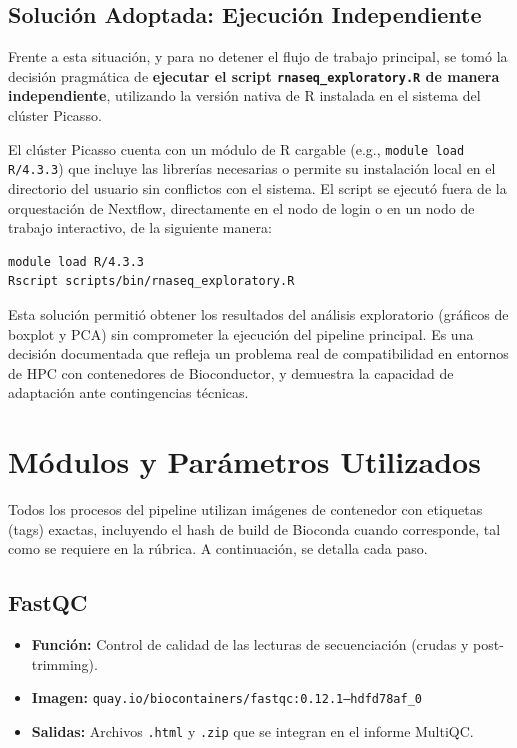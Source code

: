 \documentclass[11pt,a4paper]{article}
\begin{document}
\subsection{Solución Adoptada: Ejecución Independiente}

Frente a esta situación, y para no detener el flujo de trabajo principal, se tomó la decisión pragmática de \textbf{ejecutar el script \texttt{rnaseq\_exploratory.R} de manera independiente}, utilizando la versión nativa de R instalada en el sistema del clúster Picasso.

El clúster Picasso cuenta con un módulo de R cargable (e.g., \texttt{module load R/4.3.3}) que incluye las librerías necesarias o permite su instalación local en el directorio del usuario sin conflictos con el sistema. El script se ejecutó fuera de la orquestación de Nextflow, directamente en el nodo de login o en un nodo de trabajo interactivo, de la siguiente manera:

\begin{verbatim}
module load R/4.3.3
Rscript scripts/bin/rnaseq_exploratory.R
\end{verbatim}

Esta solución permitió obtener los resultados del análisis exploratorio (gráficos de boxplot y PCA) sin comprometer la ejecución del pipeline principal. Es una decisión documentada que refleja un problema real de compatibilidad en entornos de HPC con contenedores de Bioconductor, y demuestra la capacidad de adaptación ante contingencias técnicas.

\section{Módulos y Parámetros Utilizados}
\label{sec:modulos}

Todos los procesos del pipeline utilizan imágenes de contenedor con etiquetas (tags) exactas, incluyendo el hash de build de Bioconda cuando corresponde, tal como se requiere en la rúbrica. A continuación, se detalla cada paso.

\subsection{FastQC}
\begin{itemize}
    \item \textbf{Función:} Control de calidad de las lecturas de secuenciación (crudas y post-trimming).
    \item \textbf{Imagen:} \texttt{quay.io/biocontainers/fastqc:0.12.1--hdfd78af\_0}
    \item \textbf{Salidas:} Archivos \texttt{.html} y \texttt{.zip} que se integran en el informe MultiQC.
\end{itemize}
\end{document}
